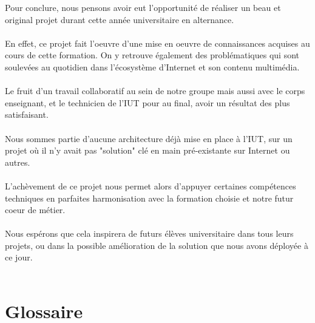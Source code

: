 \documentclass{report}
\begin{document}
Pour conclure, nous pensons avoir eut l'opportunité de réaliser un beau et original projet durant cette année universitaire en alternance. 
\\
\\
En effet, ce projet fait l'oeuvre d'une mise en oeuvre de connaissances acquises au cours de cette formation. On y retrouve également des problématiques qui sont soulevées au quotidien dans l'écosystème d'Internet et son contenu multimédia.
\\
\\
Le fruit d'un travail collaboratif au sein de notre groupe mais aussi avec le corps enseignant, et le technicien de l'IUT pour au final, avoir un résultat des plus satisfaisant.
\\
\\
Nous sommes partie d'aucune architecture déjà mise en place à l'IUT, sur un projet où il n'y avait pas "solution" clé en main pré-existante sur Internet ou autres.
\\
\\
L'achèvement de ce projet nous permet alors d'appuyer certaines compétences techniques en parfaites harmonisation avec la formation choisie et notre futur coeur de métier.
\\
\\
Nous espérons que cela inspirera de futurs élèves universitaire dans tous leurs projets, ou dans la possible amélioration de la solution que nous avons déployée à ce jour.
\\
\\


\chapter{Glossaire}
\end{document}
